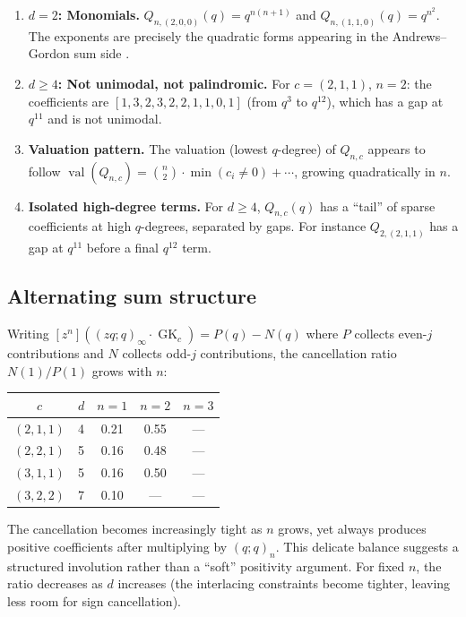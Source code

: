 \documentclass[11pt]{article}
\newcommand{\GK}{\operatorname{GK}}
\newcommand{\qpoch}[2]{(#1;#2)_\infty}
\begin{document}
\begin{enumerate}
  \item \textbf{$d = 2$: Monomials.}
    $Q_{n,(2,0,0)}(q) = q^{n(n+1)}$ and $Q_{n,(1,1,0)}(q) = q^{n^2}$.
    The exponents are precisely the quadratic forms appearing in the
    Andrews--Gordon sum side \cite[eq.~1.2]{Warnaar2021}.

  \item \textbf{$d \geq 4$: Not unimodal, not palindromic.}
    For $c = (2,1,1)$, $n = 2$: the coefficients are
    $[1, 3, 2, 3, 2, 2, 1, 1, 0, 1]$ (from $q^3$ to $q^{12}$),
    which has a gap at $q^{11}$ and is not unimodal.

  \item \textbf{Valuation pattern.}
    The valuation (lowest $q$-degree) of $Q_{n,c}$ appears to follow
    $\operatorname{val}(Q_{n,c}) = \binom{n}{2} \cdot \min(c_i \neq 0) + \cdots$,
    growing quadratically in $n$.

  \item \textbf{Isolated high-degree terms.}
    For $d \geq 4$, $Q_{n,c}(q)$ has a ``tail'' of sparse coefficients
    at high $q$-degrees, separated by gaps. For instance $Q_{2,(2,1,1)}$
    has a gap at $q^{11}$ before a final $q^{12}$ term.
\end{enumerate}

\subsection{Alternating sum structure}

Writing $[z^n](\qpoch{zq}{q} \cdot \GK_c) = P(q) - N(q)$ where $P$ collects
even-$j$ contributions and $N$ collects odd-$j$ contributions, the cancellation
ratio $N(1)/P(1)$ grows with $n$:

\begin{center}
\begin{tabular}{c|c|ccc}
$c$ & $d$ & $n=1$ & $n=2$ & $n=3$ \\
\hline
$(2,1,1)$ & 4 & 0.21 & 0.55 & --- \\
$(2,2,1)$ & 5 & 0.16 & 0.48 & --- \\
$(3,1,1)$ & 5 & 0.16 & 0.50 & --- \\
$(3,2,2)$ & 7 & 0.10 & --- & --- \\
\end{tabular}
\end{center}

The cancellation becomes increasingly tight as $n$ grows, yet always produces
positive coefficients after multiplying by $(q;q)_n$. This delicate balance
suggests a structured involution rather than a ``soft'' positivity argument.
For fixed $n$, the ratio decreases as $d$ increases (the interlacing constraints
become tighter, leaving less room for sign cancellation).
\end{document}
